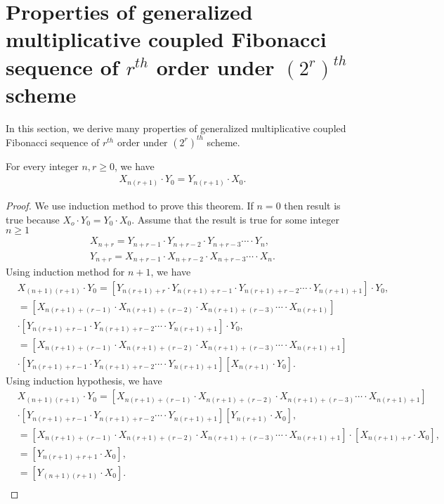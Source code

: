 \section{Properties of generalized multiplicative coupled Fibonacci  sequence of $r^{th}$  order under $(2^r)^{th}$ scheme}
In this section, we derive many properties of generalized multiplicative coupled Fibonacci  sequence of $r^{th}$  order under $(2^r)^{th}$ scheme.
\begin{theorem} For every integer $n, r\geq0$, we have
\begin{align}
X_{n(r+1)}\cdot Y_{0}=Y_{n(r+1)}\cdot X_{0}.
\end{align}
\end{theorem}
\begin{proof} We use induction method to prove this theorem. If $n=0$ then result is true because $X_{o}\cdot Y_{0}=Y_{0}\cdot X_{0}$. Assume that the result is true for some integer $n\geq1$
	\begin{align*}
	X_{n+r}=Y_{n+r-1}\cdot Y_{n+r-2}\cdot Y_{n+r-3}\cdots\cdot Y_{n}, \\
	Y_{n+r}=X_{n+r-1}\cdot X_{n+r-2}\cdot X_{n+r-3}\cdots\cdot X_{n}.
	\end{align*}
Using induction method for $n+1$, we have
\begin{align*}
&X_{(n+1)(r+1)}\cdot Y_{0}=\left[Y_{n(r+1)+r}\cdot Y_{n(r+1)+r-1}\cdot Y_{n(r+1)+r-2}\cdots\cdot Y_{n(r+1)+1}\right]\cdot Y_{0},\\
&=\left[X_{n(r+1)+(r-1)}\cdot X_{n(r+1)+(r-2)}\cdot X_{n(r+1)+(r-3)}\cdots\cdot X_{n(r+1)}\right]\\
&\cdot\left[Y_{n(r+1)+r-1}\cdot Y_{n(r+1)+r-2}\cdots\cdot Y_{n(r+1)+1}\right]\cdot Y_{0},\\
&=\left[X_{n(r+1)+(r-1)}\cdot X_{n(r+1)+(r-2)}\cdot X_{n(r+1)+(r-3)}\cdots\cdot X_{n(r+1)+1}\right]\\
&\cdot\left[Y_{n(r+1)+r-1}\cdot Y_{n(r+1)+r-2}\cdots\cdot Y_{n(r+1)+1}\right]\left[X_{n(r+1)}\cdot Y_{0}\right].
\end{align*}
Using induction hypothesis, we have
\begin{align*}
&X_{(n+1)(r+1)}\cdot Y_{0}=\left[X_{n(r+1)+(r-1)}\cdot X_{n(r+1)+(r-2)}\cdot X_{n(r+1)+(r-3)}\cdots\cdot X_{n(r+1)+1}\right]\\
&\cdot\left[Y_{n(r+1)+r-1}\cdot Y_{n(r+1)+r-2}\cdots\cdot Y_{n(r+1)+1}\right]\left[Y_{n(r+1)}\cdot X_{0}\right],\\
&=\left[X_{n(r+1)+(r-1)}\cdot X_{n(r+1)+(r-2)}\cdot X_{n(r+1)+(r-3)}\cdots\cdot X_{n(r+1)+1}\right]\cdot\left[X_{n(r+1)+r}\cdot X_{0}\right],\\
&=\left[Y_{n(r+1)+r+1}\cdot X_{0}\right],\\
&=\left[Y_{(n+1)(r+1)}\cdot X_{0}\right].\\
\end{align*}
\end{proof}

